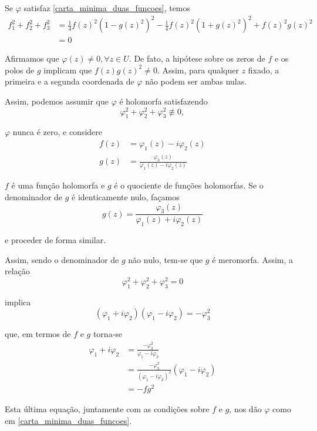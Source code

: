 \begin{demonstracao}
	Se $\varphi$ satisfaz \ref{carta_minima_duas_funcoes}, temos
	\begin{align*}
	f_1^2 + f_2^2 + f_3^2 &= \frac{1}{4} f(z)^2 (1 - g(z)^2)^2 - \frac{1}{4} f(z)^2 (1 + g(z)^2)^2 + f(z)^2 g(z)^2\\
	&= 0
	\end{align*}
	
	Afirmamos que $\varphi(z) \neq 0, \forall z \in U$. De fato, a hipótese sobre os zeros de $f$ e os polos de $g$ implicam que $f(z) g(z)^2 \neq 0$. Assim, para qualquer $z$ fixado, a primeira e a segunda coordenada de $\varphi$ não podem ser ambas nulas.
	
	Assim, podemos assumir que $\varphi$ é holomorfa satisfazendo
	\begin{equation*}
	\varphi_1^2 + \varphi_2^2 + \varphi_3^2 \not\equiv 0,
	\end{equation*}
	
	$\varphi$ nunca é zero, e considere
	\begin{align*}
	f(z) &= \varphi_1(z) - i \varphi_2(z)\\
	g(z) &= \frac{\varphi_3(z)}{\varphi_1(z) - i \varphi_2(z)}
	\end{align*}
	
	$f$ é uma função holomorfa e $g$ é o quociente de funções holomorfas. Se o denominador de $g$ é identicamente nulo, façamos
	\begin{equation*}
	g(z) = \frac{\varphi_3(z)}{\varphi_1(z) + i \varphi_2(z)}
	\end{equation*}
	
	e proceder de forma similar.
	
	Assim, sendo o denominador de $g$ não nulo, tem-se que $g$ é meromorfa. Assim, a relação
	\begin{equation*}
	\varphi_1^2 + \varphi_2^2 + \varphi_3^2 = 0
	\end{equation*}
	
	implica
	\begin{equation*}
	(\varphi_1 + i \varphi_2)(\varphi_1 - i \varphi_2) = -\varphi_3^2
	\end{equation*}
	
	que, em termos de $f$ e $g$ torna-se
	\begin{align*}
	\varphi_1 + i \varphi_2 &= \frac{-\varphi_3^2}{\varphi_1 - i \varphi_2}\\
	&= \frac{-\varphi_3^2}{(\varphi_1 - i \varphi_2)^2} (\varphi_1 - i \varphi_2)\\
	&= -fg^2
	\end{align*}
	
	Esta última equação, juntamente com as condições sobre $f$ e $g$, nos dão $\varphi$ como em \ref{carta_minima_duas_funcoes}.
\end{demonstracao}


